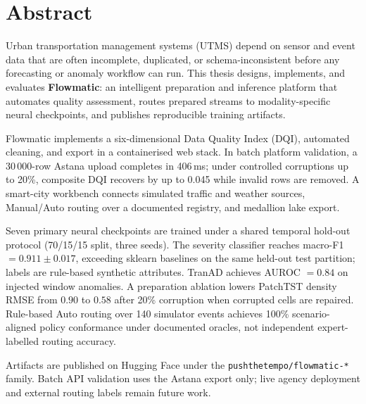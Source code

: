 %
%
\chapter{Abstract}
\begin{SingleSpace}
Urban transportation management systems (UTMS) depend on sensor and event data that are often incomplete, duplicated, or schema-inconsistent before any forecasting or anomaly workflow can run. This thesis designs, implements, and evaluates \textbf{Flowmatic}: an intelligent preparation and inference platform that automates quality assessment, routes prepared streams to modality-specific neural checkpoints, and publishes reproducible training artifacts.

Flowmatic implements a six-dimensional Data Quality Index (DQI), automated cleaning, and export in a containerised web stack. In batch platform validation, a 30\,000-row Astana upload completes in 406\,ms; under controlled corruptions up to 20\%, composite DQI recovers by up to 0.045 while invalid rows are removed. A smart-city workbench connects simulated traffic and weather sources, Manual/Auto routing over a documented registry, and medallion lake export.

Seven primary neural checkpoints are trained under a shared temporal hold-out protocol (70/15/15 split, three seeds). The severity classifier reaches macro-F1 $= 0.911 \pm 0.017$, exceeding sklearn baselines on the same held-out test partition; labels are rule-based synthetic attributes. TranAD achieves AUROC $= 0.84$ on injected window anomalies. A preparation ablation lowers PatchTST density RMSE from $0.90$ to $0.58$ after 20\% corruption when corrupted cells are repaired. Rule-based Auto routing over 140 simulator events achieves 100\% scenario-aligned policy conformance under documented oracles, not independent expert-labelled routing accuracy.

Artifacts are published on Hugging Face under the \texttt{pushthetempo/flowmatic-*} family. Batch API validation uses the Astana export only; live agency deployment and external routing labels remain future work.

\end{SingleSpace}
